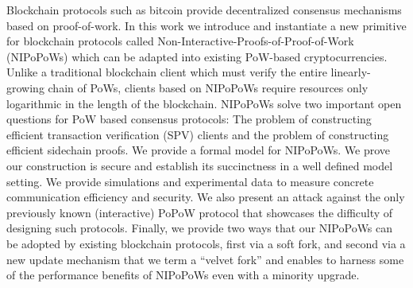 Blockchain protocols such as bitcoin provide decentralized consensus mechanisms
based on proof-of-work. In this work we introduce and instantiate a new
primitive for blockchain protocols called
Non-Interactive-Proofs-of-Proof-of-Work (NIPoPoWs) which can be adapted into
existing PoW-based cryptocurrencies. Unlike a traditional blockchain client
which must verify the entire linearly-growing chain of PoWs, clients based on
NIPoPoWs require resources only logarithmic in the length of the blockchain.
NIPoPoWs solve two important open questions for PoW based consensus protocols:
The problem of constructing efficient transaction verification (SPV) clients and
the problem of constructing efficient sidechain proofs. We provide a formal
model for NIPoPoWs. We prove our construction is secure and establish its
succinctness in a well defined model setting. We provide simulations and
experimental data to measure concrete communication efficiency and security. We
also present an attack against the only previously known (interactive) PoPoW
protocol that showcases the difficulty of designing such protocols. Finally, we
provide two ways that our NIPoPoWs can be adopted by existing blockchain
protocols, first via a soft fork, and second via a new update mechanism that we
term a ``velvet fork'' and enables to harness some of the performance benefits
of NIPoPoWs even with a minority upgrade.
